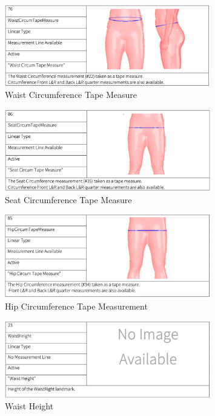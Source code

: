 \begin{figure} [H]
    \centering
    \includegraphics[width = 0.8\textwidth]{Images/Waist CircumTM.png}
    \caption{Waist Circumference Tape Measure}
\end{figure}
\begin{figure} [H]
    \centering
    \includegraphics[width = 0.8\textwidth]{Images/SeatCircTM.png}
    \caption{Seat Circumference Tape Measure}
\end{figure}
\begin{figure} [H]
    \centering
    \includegraphics[width = 0.8\textwidth]{Images/HipCircTM.png}
    \caption{Hip Circumference Tape Measurement}
\end{figure}
\begin{figure} [H]
    \centering
    \includegraphics[width = 0.8\textwidth]{Images/WaistHeight measurment.png}
    \caption{Waist Height}
\end{figure}
